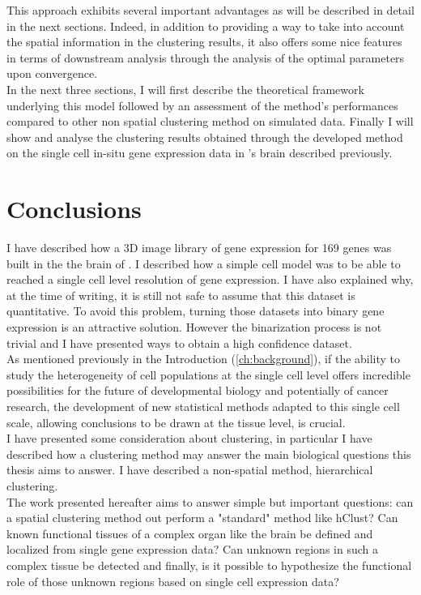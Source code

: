 This approach exhibits several important advantages as will be described in detail in the next sections. Indeed, in addition to providing a way to take into account the spatial information in the clustering results, it also offers some nice features in terms of downstream analysis through the analysis of the optimal parameters upon convergence.\\

In the next three sections, I will first describe the theoretical framework underlying this model followed by an assessment of the method's performances compared to other non spatial clustering method on simulated data. Finally I will show and analyse the clustering results obtained through the developed method on the single cell in-situ gene expression data in \platy{}'s brain described previously.


\section{Conclusions}
I have described how a 3D image library of gene expression for 169 genes was built in the the brain of \platyfull{}. I described how a simple cell model was to be able to reached a single cell level resolution of gene expression. I have also explained why, at the time of writing, it is still not safe to assume that this dataset is quantitative. To avoid this problem, turning those datasets into binary gene expression is an attractive solution. However the binarization process is not trivial and I have presented ways to obtain a high confidence dataset.\\

As mentioned previously in the Introduction (\ref{ch:background}), if the ability to study the heterogeneity of cell populations at the single cell level offers incredible possibilities for the future of developmental biology and potentially of cancer research, the development of new statistical methods adapted to this single cell scale, allowing conclusions to be drawn at the tissue level, is crucial.\\

I have presented some consideration about clustering, in particular I have described how a clustering method may answer the main biological questions this thesis aims to answer. I have described a non-spatial method, hierarchical clustering. \\

The work presented hereafter aims to answer simple but important questions: can a spatial clustering method out perform a "standard" method like hClust? Can known functional tissues of a complex organ like the brain be defined and localized from single gene expression data? Can unknown regions in such a complex tissue be detected and finally, is it possible to hypothesize the functional role of those unknown regions based on single cell expression data?



